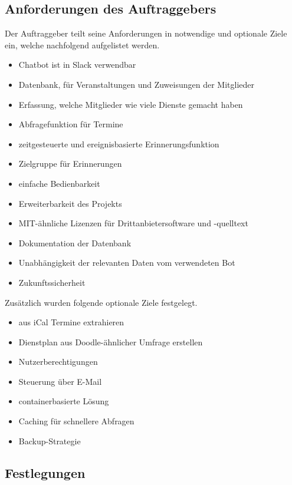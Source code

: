 \subsection{Anforderungen des Auftraggebers}
Der Auftraggeber teilt seine Anforderungen in notwendige und optionale Ziele ein, welche nachfolgend aufgelistet werden.

\begin{itemize}
	\item Chatbot ist in Slack verwendbar
	\item Datenbank, für Veranstaltungen und Zuweisungen der Mitglieder
	\item Erfassung, welche Mitglieder wie viele Dienste gemacht haben
	\item Abfragefunktion für Termine
	\item zeitgesteuerte und ereignisbasierte Erinnerungsfunktion
	\item Zielgruppe für Erinnerungen
	\item einfache Bedienbarkeit
	\item Erweiterbarkeit des Projekts
	\item MIT-ähnliche Lizenzen für Drittanbietersoftware und -quelltext
	\item Dokumentation der Datenbank
	\item Unabhängigkeit der relevanten Daten vom verwendeten Bot
	\item Zukunftssicherheit
\end{itemize}


Zusätzlich wurden folgende optionale Ziele festgelegt.
\begin{itemize}
	\item aus iCal Termine extrahieren
	\item Dienstplan aus Doodle-ähnlicher Umfrage erstellen
	\item Nutzerberechtigungen
	\item Steuerung über E-Mail
	\item containerbasierte Lösung
	\item Caching für schnellere Abfragen
	\item Backup-Strategie
\end{itemize}


\subsection{Festlegungen}

